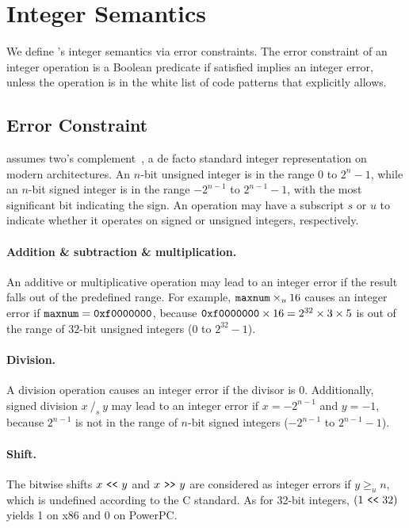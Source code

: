 \section{Integer Semantics}
\label{s:sema}

We define \sys's integer semantics via error constraints.  The error
constraint of an integer operation is a Boolean predicate if satisfied
implies an integer error, unless the operation is in the white list
of code patterns that \sys explicitly allows.

\subsection{Error Constraint}
\label{s:sema:constr}

\sys assumes two's complement~\cite[\chapterautorefname~4.2.1]{intel:vol1},
a de facto standard integer representation on modern architectures.
An $n$-bit unsigned integer is in the range $0$ to $2^n-1$, while
an $n$-bit signed integer is in the range $-2^{n-1}$ to $2^{n-1}-1$,
with the most significant bit indicating the sign.  An operation
may have a subscript $s$ or $u$ to indicate whether it operates on
signed or unsigned integers, respectively.

\paragraph{Addition \& subtraction \& multiplication.}
An additive or multiplicative operation may lead to an integer error
if the result falls out of the predefined range.  For example,
$\texttt{maxnum}\times_u 16$ causes an integer error if $\texttt{maxnum} =
\texttt{0xf0000000}$, because $\texttt{0xf0000000} \times 16 = 2^{32}\times
3\times 5$ is out of the range of $32$-bit unsigned integers ($0$
to $2^{32} - 1$).

\paragraph{Division.}
A division operation causes an integer error if the divisor is 0.
Additionally, signed division $x\ /_s\ y$ may lead to an integer
error if $x = -2^{n-1}$ and $y = -1$, because $2^{n-1}$ is not in
the range of $n$-bit signed integers ($-2^{n-1}$ to $2^{n-1}-1$).

\paragraph{Shift.}
The bitwise shifts $x \ \texttt{<}\texttt{<}\  y$ and $x \ \texttt{>}\texttt{>}\  y$ are considered as
integer errors if $y \geq_u n$, which is undefined according to the
C standard.  As for 32-bit integers, $(1 \ \texttt{<}\texttt{<}\  32)$ yields 1 on x86
and 0 on PowerPC.

